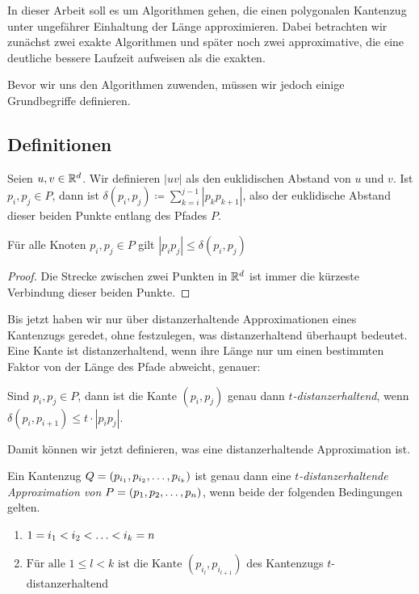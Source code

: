     In dieser Arbeit soll es um Algorithmen gehen, die einen polygonalen Kantenzug unter ungefährer Einhaltung der Länge approximieren. 
    Dabei betrachten wir zunächst zwei exakte Algorithmen und später noch zwei approximative, die eine deutliche bessere Laufzeit aufweisen als die exakten. 
    
    Bevor wir uns den Algorithmen zuwenden, müssen wir jedoch einige Grundbegriffe definieren.
   
   \subsection{Definitionen}
   \label{subsec:def}
    Seien $u, v \in \mathbb{R}^d$. Wir definieren $|uv|$ als den euklidischen Abstand von $u$ und $v$.
    Ist $p_i, p_j \in P$, dann ist $\delta(p_i, p_j) \coloneqq \sum\limits_{k=i}^{j-1}{|p_k
    p_{k+1}|}$, also der euklidische Abstand dieser beiden Punkte entlang des Pfades $P$.
	\begin{lemma}
		\label{lem:triangle}
		Für alle Knoten $p_i, p_j \in P$ gilt $|p_ip_j| \leq \delta(p_i, p_j)$
	\end{lemma}
	\begin{proof}
		Die Strecke zwischen zwei Punkten in $\mathbb{R}^d$ ist immer die kürzeste Verbindung dieser beiden Punkte.
	\end{proof}
	Bis jetzt haben wir nur über distanzerhaltende Approximationen eines Kantenzugs geredet, ohne  festzulegen, was distanzerhaltend überhaupt bedeutet. Eine Kante ist distanzerhaltend, wenn ihre Länge nur um einen bestimmten Faktor von der Länge des Pfade abweicht, genauer:
	\begin{definition}[$t$-distanzerhaltend]
		\label{def:t-dist}
		Sind $p_i, p_j \in P$, dann ist die Kante $(p_i, p_j)$ genau dann \emph{$t$-distanzerhaltend}, wenn $\delta(p_i, p_{i+1}) \leq t \cdot |p_ip_j|$.
	\end{definition}
	
	Damit können wir jetzt definieren, was eine distanzerhaltende Approximation ist.

	\begin{definition}
		\label{def:t-distapp}
		Ein Kantenzug $Q = (p_{i_1}, p_{i_2}, \mathellipsis, p_{i_k})$ ist genau dann eine \emph{$t$-distanzerhaltende Approximation von $P = (p_1, p_2, \mathellipsis, p_n)$}, wenn beide der folgenden Bedingungen gelten.
		\begin{enumerate}
			\item $\displaystyle 1 = i_1 < i_2 < \mathellipsis < i_k = n$
			\item $\displaystyle \text{Für alle } 1 \leq l < k \text{ ist die Kante } (p_{i_l}, p_{i_{l+1}})$ des Kantenzugs $t$-distanzerhaltend
		\end{enumerate}
	\end{definition}
	
